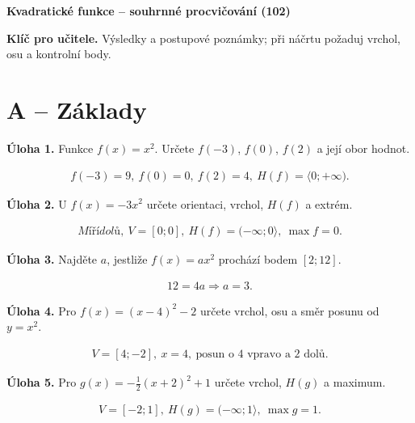 \documentclass[11pt,a4paper]{article}
\begin{document}
\begin{center}{\Large\bfseries Kvadratické funkce – souhrnné procvičování (102)}\end{center}
\textbf{Klíč pro učitele.} Výsledky a postupové poznámky; při náčrtu požaduj vrchol, osu a kontrolní body.\par
\section*{A – Základy}
\noindent\textbf{Úloha 1.} Funkce $f(x)=x^2$. Určete $f(-3)$, $f(0)$, $f(2)$ a její obor hodnot.\par
\[\begin{aligned}f(-3)=9,\ f(0)=0,\ f(2)=4,\ H(f)=\langle0;+\infty).\end{aligned}\]\par
\noindent\textbf{Úloha 2.} U $f(x)=-3x^2$ určete orientaci, vrchol, $H(f)$ a extrém.\par
\[\begin{aligned}Míří dolů,\ V=[0;0],\ H(f)=(-\infty;0\rangle,\ \max f=0.\end{aligned}\]\par
\noindent\textbf{Úloha 3.} Najděte $a$, jestliže $f(x)=ax^2$ prochází bodem $[2;12]$.\par
\[\begin{aligned}12=4a\Rightarrow a=3.\end{aligned}\]\par
\noindent\textbf{Úloha 4.} Pro $f(x)=(x-4)^2-2$ určete vrchol, osu a směr posunu od $y=x^2$.\par
\[\begin{aligned}V=[4;-2],\ x=4,\ \text{posun o 4 vpravo a 2 dolů}.\end{aligned}\]\par
\noindent\textbf{Úloha 5.} Pro $g(x)=-\frac12(x+2)^2+1$ určete vrchol, $H(g)$ a maximum.\par
\[\begin{aligned}V=[-2;1],\ H(g)=(-\infty;1\rangle,\ \max g=1.\end{aligned}\]\par
\end{document}
